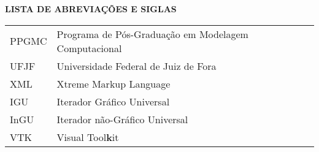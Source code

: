 \clearpage
\clearpage
\begin{center}
	\textbf{LISTA DE ABREVIAÇÕES E SIGLAS}
\end{center}

\vspace*{1.cm}

\doublespacing  \begin{tabular}{l l}
	PPGMC & Programa de Pós-Graduação em Modelagem Computacional \\
	UFJF & Universidade Federal de Juiz de Fora  \\
	XML & Xtreme Markup Language\\
	IGU & Iterador Gráfico Universal\\
	InGU & Iterador não-Gráfico Universal\\
	VTK & Visual Tool\textbf{k}it
\end{tabular}  \thispagestyle{empty}